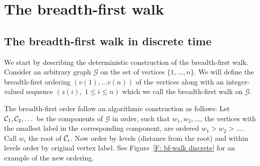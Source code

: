 
\chapter{The breadth-first walk} \label{C: bf-walk}


\section{The breadth-first walk in discrete time}

We start by describing the deterministic construction of the breadth-first walk.
Consider an arbitrary graph $\mathcal{G}$ on the set of vertices 
$\{1, \dots , n\} $.
We will define the breadth-first ordering
$(v(1), \dots v(n))$
of the vertices along with an integer-valued sequence
$(z(i), \; 1 \leq i \leq n)$
which we call the breadth-first walk on
$\mathcal{G}$.


The breadth-first order follow an algorithmic construction as follows:
Let $\mathcal{C}_{1}, \mathcal{C}_{2}, \dots$ be the components of $\mathcal{G}$ in order, such that
$w_1, w_2, \dots$, the vertices with the smallest label in the corresponding component,
are ordered $w_1 > w_2 > \dots$. 
Call $w_i$ the root of $\mathcal{C}_{i}$.
Now order by levels (distance from the root) and within levels order by original vertex label.
See Figure~\ref{F: bf-walk discrete} for an example of the new ordering.

